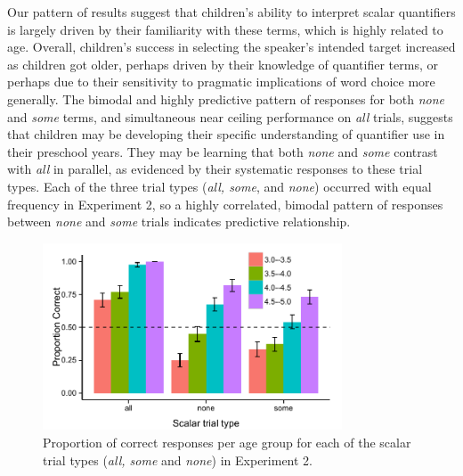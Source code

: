 \documentclass[10pt,letterpaper]{article}
\begin{document}
Our pattern of results suggest that children's ability to interpret scalar quantifiers is largely driven by their familiarity with these terms, which is highly related to age.  Overall, children's success in selecting the speaker's intended target increased as children got older, perhaps driven by their knowledge of quantifier terms, or perhaps due to their sensitivity to pragmatic implications of word choice more generally. The bimodal and highly predictive pattern of responses for both \emph{none} and \emph{some} terms, and simultaneous near ceiling performance on \emph{all} trials, suggests that children may be developing their specific understanding of quantifier use in their preschool years. They may be learning that both \emph{none} and \emph{some} contrast with \emph{all} in parallel, as evidenced by their systematic responses to these trial types. Each of the three trial types (\emph{all, some}, and \emph{none}) occurred with equal frequency in Experiment 2, so a highly correlated, bimodal pattern of responses between \emph{none} and \emph{some} trials indicates predictive relationship. 


\begin{figure}[t] 
  \begin{center} 
    \includegraphics[width=3.5in]{figures/implicatures_scalarOnly.pdf} 
    \caption{\label{fig:expt2} Proportion of correct responses per age group for each of the scalar trial types (\emph{all, some} and \emph{none}) in Experiment 2.     }
    \end{center} 
\vspace{-1ex} 
\end{figure}
\end{document}
